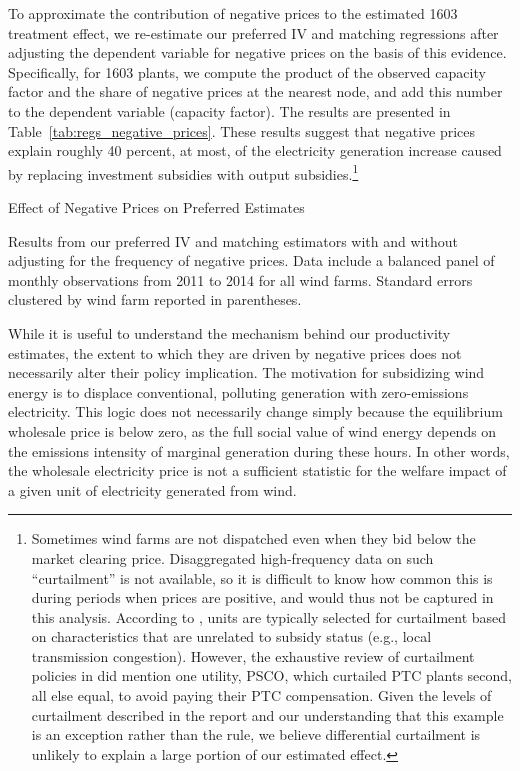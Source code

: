 \documentclass[12pt]{article}
\begin{document}
To approximate the contribution of negative prices to the estimated 1603 treatment effect, we re-estimate our preferred IV and matching regressions after adjusting the dependent variable for negative prices on the basis of this evidence. Specifically, for 1603 plants, we compute the product of the observed capacity factor and the share of negative prices at the nearest node, and add this number to the dependent variable (capacity factor). The results are presented in Table~\ref{tab:regs_negative_prices}. These results suggest that negative prices explain roughly 40 percent, at most, of the electricity generation increase caused by replacing investment subsidies with output subsidies.\footnote{Sometimes wind farms are not dispatched even when they bid below the market clearing price. Disaggregated high-frequency data on such ``curtailment'' is not available, so it is difficult to know how common this is during periods when prices are positive, and would thus not be captured in this analysis. According to \cite{bird_wind_2014}, units are typically selected for curtailment based on characteristics that are unrelated to subsidy status (e.g., local transmission congestion). However, the exhaustive review of curtailment policies in \cite{bird_wind_2014} did mention one utility, PSCO, which curtailed PTC plants second, all else equal, to avoid paying their PTC compensation. Given the levels of curtailment described in the report and our understanding that this example is an exception rather than the rule, we believe differential curtailment is unlikely to explain a large portion of our estimated effect.} 

\begin{table}[h]
    \caption{Effect of Negative Prices on Preferred Estimates \label{tab:regs_negative_prices}}
    \begin{center} {\footnotesize{}} \end{center}
    \footnotesize
    
    Results from our preferred IV and matching estimators with and without adjusting for the frequency of negative prices. Data include a balanced panel of monthly observations from 2011 to 2014 for all wind farms. Standard errors clustered by wind farm reported in parentheses.
\end{table}

While it is useful to understand the mechanism behind our productivity estimates, the extent to which they are driven by negative prices does not necessarily alter their policy implication. The motivation for subsidizing wind energy is to displace conventional, polluting generation with zero-emissions electricity. This logic does not necessarily change simply because the equilibrium wholesale price is below zero, as the full social value of wind energy depends on the emissions intensity of marginal generation during these hours. In other words, the wholesale electricity price is not a sufficient statistic for the welfare impact of a given unit of electricity generated from wind. 
\end{document}
